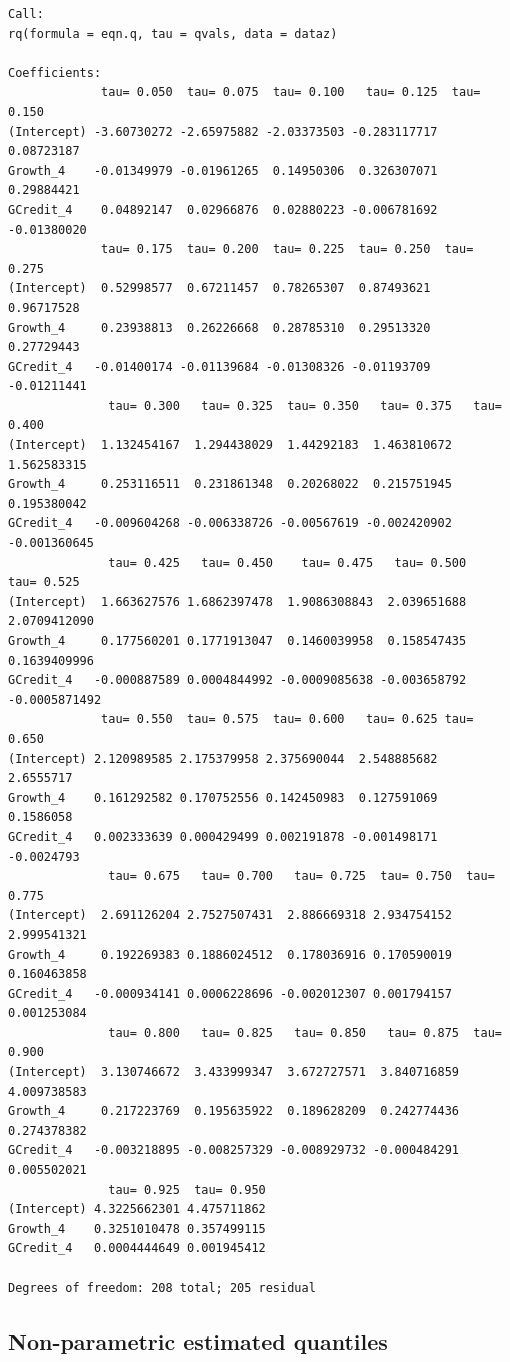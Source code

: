 \documentclass[
  letterpaper,
]{book}
\begin{document}
\begin{verbatim}
Call:
rq(formula = eqn.q, tau = qvals, data = dataz)

Coefficients:
             tau= 0.050  tau= 0.075  tau= 0.100   tau= 0.125  tau= 0.150
(Intercept) -3.60730272 -2.65975882 -2.03373503 -0.283117717  0.08723187
Growth_4    -0.01349979 -0.01961265  0.14950306  0.326307071  0.29884421
GCredit_4    0.04892147  0.02966876  0.02880223 -0.006781692 -0.01380020
             tau= 0.175  tau= 0.200  tau= 0.225  tau= 0.250  tau= 0.275
(Intercept)  0.52998577  0.67211457  0.78265307  0.87493621  0.96717528
Growth_4     0.23938813  0.26226668  0.28785310  0.29513320  0.27729443
GCredit_4   -0.01400174 -0.01139684 -0.01308326 -0.01193709 -0.01211441
              tau= 0.300   tau= 0.325  tau= 0.350   tau= 0.375   tau= 0.400
(Intercept)  1.132454167  1.294438029  1.44292183  1.463810672  1.562583315
Growth_4     0.253116511  0.231861348  0.20268022  0.215751945  0.195380042
GCredit_4   -0.009604268 -0.006338726 -0.00567619 -0.002420902 -0.001360645
              tau= 0.425   tau= 0.450    tau= 0.475   tau= 0.500    tau= 0.525
(Intercept)  1.663627576 1.6862397478  1.9086308843  2.039651688  2.0709412090
Growth_4     0.177560201 0.1771913047  0.1460039958  0.158547435  0.1639409996
GCredit_4   -0.000887589 0.0004844992 -0.0009085638 -0.003658792 -0.0005871492
             tau= 0.550  tau= 0.575  tau= 0.600   tau= 0.625 tau= 0.650
(Intercept) 2.120989585 2.175379958 2.375690044  2.548885682  2.6555717
Growth_4    0.161292582 0.170752556 0.142450983  0.127591069  0.1586058
GCredit_4   0.002333639 0.000429499 0.002191878 -0.001498171 -0.0024793
              tau= 0.675   tau= 0.700   tau= 0.725  tau= 0.750  tau= 0.775
(Intercept)  2.691126204 2.7527507431  2.886669318 2.934754152 2.999541321
Growth_4     0.192269383 0.1886024512  0.178036916 0.170590019 0.160463858
GCredit_4   -0.000934141 0.0006228696 -0.002012307 0.001794157 0.001253084
              tau= 0.800   tau= 0.825   tau= 0.850   tau= 0.875  tau= 0.900
(Intercept)  3.130746672  3.433999347  3.672727571  3.840716859 4.009738583
Growth_4     0.217223769  0.195635922  0.189628209  0.242774436 0.274378382
GCredit_4   -0.003218895 -0.008257329 -0.008929732 -0.000484291 0.005502021
              tau= 0.925  tau= 0.950
(Intercept) 4.3225662301 4.475711862
Growth_4    0.3251010478 0.357499115
GCredit_4   0.0004444649 0.001945412

Degrees of freedom: 208 total; 205 residual
\end{verbatim}

\hypertarget{non-parametric-estimated-quantiles}{%
\subsection{Non-parametric estimated
quantiles}\label{non-parametric-estimated-quantiles}}
\end{document}
